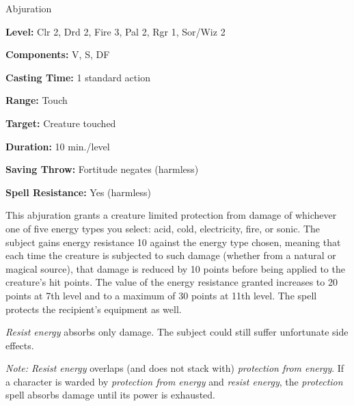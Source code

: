 
Abjuration

\textbf{Level:} Clr 2, Drd 2, Fire 3, Pal 2, Rgr 1, Sor/Wiz 2

\textbf{Components:} V, S, DF

\textbf{Casting Time:} 1 standard action

\textbf{Range:} Touch

\textbf{Target:} Creature touched

\textbf{Duration:} 10 min./level

\textbf{Saving Throw:} Fortitude negates (harmless)

\textbf{Spell Resistance:} Yes (harmless)

This abjuration grants a creature limited protection from damage of whichever one 
of five energy types you select: acid, cold, electricity, fire, or sonic. The subject 
gains energy resistance 10 against the energy type chosen, meaning that each time 
the creature is subjected to such damage (whether from a natural or magical source), 
that damage is reduced by 10 points before being applied to the creature's hit 
points. The value of the energy resistance granted increases to 20 points at 7th 
level and to a maximum of 30 points at 11th level. The spell protects the recipient's 
equipment as well.

\textit{Resist energy} absorbs only damage. The subject could still suffer unfortunate 
side effects.

\textit{Note: Resist energy} overlaps (and does not stack with) \textit{protection 
from energy}. If a character is warded by \textit{protection from energy} and \textit{resist 
energy}, the \textit{protection} spell absorbs damage until its power is exhausted.

